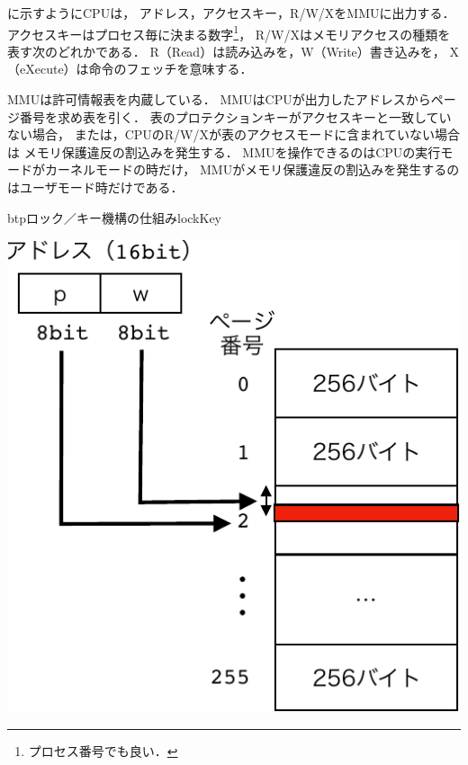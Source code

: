 に示すようにCPUは，
アドレス，アクセスキー，R/W/XをMMUに出力する．
アクセスキーはプロセス毎に決まる数字\footnote{プロセス番号でも良い．}，
R/W/Xはメモリアクセスの種類を表す次のどれかである．
R（Read）は読み込みを，W（Write）書き込みを，
X（eXecute）は命令のフェッチを意味する．

MMUは許可情報表を内蔵している．
MMUはCPUが出力したアドレスからページ番号を求め表を引く．
表のプロテクションキーがアクセスキーと一致していない場合，
または，CPUのR/W/Xが表のアクセスモードに含まれていない場合は
メモリ保護違反の割込みを発生する．
MMUを操作できるのはCPUの実行モードがカーネルモードの時だけ，
MMUがメモリ保護違反の割込みを発生するのはユーザモード時だけである．

\begin{myfig}{btp}{ロック／キー機構の仕組み}{lockKey}
  \begin{minipage}{0.49\columnwidth}
    \begin{center}
      \includegraphics[scale=0.66]{Fig/lockKeyAddrSpace-crop.pdf}
      \label{fig:lockKeyAddrSpace}
    \end{center}
  \end{minipage}
  \begin{minipage}{0.49\columnwidth}
    \begin{center}

\end{center}
\end{minipage}
\end{myfig}
